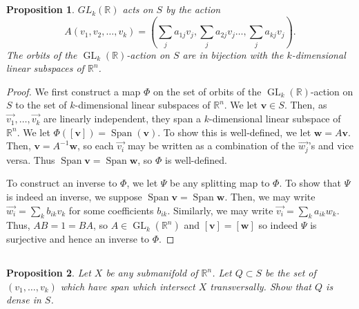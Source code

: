 \documentclass[english]{article}
\let\avec=\vec
\renewcommand\vec{\mathbf}
\newcommand{\RR}{\mathbb{R}}
\newcommand{\prt}[1]{\setcounter{subsection}{#1-1}\subsection{}}
\newtheorem*{proposition*}{Proposition}
\theoremstyle{remark}
\theoremstyle{definition}
\DeclareMathOperator{\gl}{GL}
\DeclareMathOperator{\spn}{Span}
\begin{document}
\prt{3}
\begin{proposition*}
	$GL_k(\RR)$ acts on $S$ by the action \[ A(v_1,v_2,\dots,v_k)=(\sum_{j}a_{1j}v_j,\sum_{j}a_{2j}v_j\dots,\sum_ja_{kj}v_j).\] The orbits of the $\gl_k(\RR)$-action on $S$ are in bijection with the $k$-dimensional linear subspaces of $\RR^n$.\end{proposition*}
\begin{proof}
	We first construct a map $\Phi$ on the set of orbits of the $\gl_k(\RR)$-action on $S$ to the set of $k$-dimensional linear subspaces of $\RR^n$.
	We let $\vec{v}\in S$. Then, as $\avec{v_1},\dots,\avec{v_k}$ are linearly independent, they span a $k$-dimensional linear subspace of $\RR^n$. We let $\Phi([\vec{v}])=\spn(\vec{v})$. To show this is well-defined, we let $\vec{w}=A\vec{v}$. Then, $\vec{v}=A^{-1}\vec{w}$, so each $\avec{v_i}$ may be written as a combination of the $\avec{w_j}$'s and vice versa. Thus $\spn \vec{v}=\spn\vec{w}$, so $\Phi$ is well-defined.
	
	To construct an inverse to $\Phi$, we let $\Psi$ be any splitting map to $\Phi$. To show that $\Psi$ is indeed an inverse, we suppose $\spn \vec{v}=\spn\vec{w}$. Then, we may write $\avec{w_i}=\sum_kb_{ik}v_k$ for some coefficients $b_{ik}$. Similarly, we may write $\avec{v_i}=\sum_ka_{ik}w_k$. Thus, $AB=1=BA$, so $A\in \gl_k(\RR^n)$ and $[\vec{v}]=[\vec{w}]$ so indeed $\Psi$ is surjective and hence an inverse to $\Phi$.

\end{proof}
\prt{4}
\begin{proposition*}
	Let $X$ be any submanifold of $\RR^n$. Let $Q\subset S$ be the set of $(v_1,\dots,v_k)$ which have span which intersect $X$ transversally. Show that $Q$ is dense in $S$.  
\end{proposition*}
\end{document}
